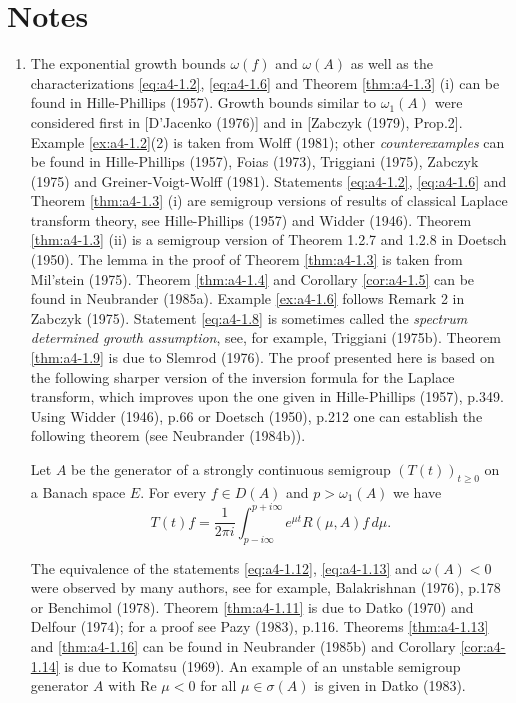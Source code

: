 \section*{Notes}
\begin{enumerate}[label=\emph{Section \arabic*:}, wide]

\item The exponential growth bounds $\omega(f)$ and $\omega(A)$ as well as the characterizations \eqref{eq:a4-1.2}, \eqref{eq:a4-1.6} and Theorem \ref{thm:a4-1.3} (i) can be found in Hille-Phillips (1957).
Growth bounds similar to $\omega_{1}(A)$ were considered first in [D'Jacenko (1976)] and in [Zabczyk (1979), Prop.2]. 
Example \ref{ex:a4-1.2}(2) is taken from Wolff (1981); other \emph{counterexamples} can be found in Hille-Phillips (1957), Foias (1973), Triggiani (1975), Zabczyk (1975) and Greiner-Voigt-Wolff (1981). 
Statements \eqref{eq:a4-1.2}, \eqref{eq:a4-1.6} and Theorem \ref{thm:a4-1.3} (i) are semigroup versions of results of classical Laplace transform theory, see Hille-Phillips (1957) and Widder (1946). 
Theorem \ref{thm:a4-1.3} (ii) is a semigroup version of Theorem 1.2.7 and 1.2.8 in Doetsch (1950). 
The lemma in the proof of Theorem \ref{thm:a4-1.3} is taken from Mil'stein (1975). 
Theorem \ref{thm:a4-1.4} and Corollary \ref{cor:a4-1.5} can be found in Neubrander (1985a). 
Example \ref{ex:a4-1.6} follows Remark 2 in Zabczyk (1975). 
Statement \eqref{eq:a4-1.8} is sometimes called the \emph{spectrum determined growth assumption}, see, for example, Triggiani (1975b). 
Theorem \ref{thm:a4-1.9} is due to Slemrod (1976). 
The proof presented here is based on the following sharper version of the inversion formula for the Laplace transform, which improves upon the one given in Hille-Phillips (1957), p.349. 
Using Widder (1946), p.66 or Doetsch (1950), p.212 one can establish the following theorem (see Neubrander (1984b)).

\begin{theorem}\label{thm:a4-2.6}
Let $A$ be the generator of a strongly continuous semigroup $(T(t))_{t \geq 0}$ on a Banach space $E$. 
For every $f \in D(A)$ and $p > \omega_{1}(A)$ we have
\[
T(t)f = \frac{1}{2\pi i} \int_{p-i\infty}^{p+i\infty} e^{\mu t}R(\mu,A)f \, d\mu.
\]
\end{theorem}
\noindent
The equivalence of the statements \eqref{eq:a4-1.12}, \eqref{eq:a4-1.13} and \emph{$\omega(A) < 0$} were observed by many authors, see for example, Balakrishnan (1976), p.178 or Benchimol (1978).
Theorem \ref{thm:a4-1.11} is due to Datko (1970) and Delfour (1974); for a proof see Pazy (1983), p.116. 
Theorems \ref{thm:a4-1.13} and \ref{thm:a4-1.16} can be found in Neubrander (1985b) and Corollary \ref{cor:a4-1.14} is due to Komatsu (1969). 
An example of an unstable semigroup generator $A$ with Re $\mu < 0$ for all $\mu \in \sigma(A)$ is given in Datko (1983).


\end{enumerate}
